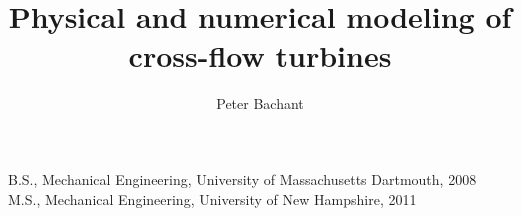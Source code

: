 
\title{Physical and numerical modeling of cross-flow turbines}

\author{Peter Bachant}

\prevdegrees
{
    B.S., Mechanical Engineering, University of Massachusetts Dartmouth, 2008
    \\
    M.S., Mechanical Engineering, University of New Hampshire, 2011
}






\frontmatter

\maketitle
